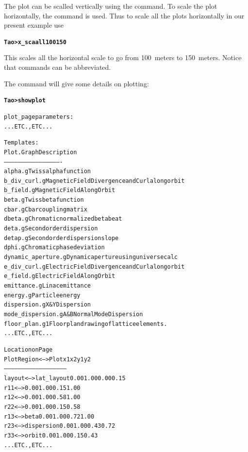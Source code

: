 \documentclass{hitec}
\newcommand{\BF}[1]{{\normalfont\textbf{#1}}}
\begin{document}
The plot can be scalled vertically using the  command. To scale the plot horizontally, 
the command  is used. Thus to scale all the plots horizontally in our present example use
\begin{alltt}
  \BF{Tao> x_sca all 100 150}
\end{alltt}
This scales all the horizontal scale to go from 100~meters to 150~meters.  Notice that
commands can be abbreviated.

The  command will give some details on plotting:
\begin{alltt}
  \BF{Tao> show plot}

    plot_page parameters:
    ... ETC., ETC ...

  Templates:
     Plot                  .Graph   Description
     --------------------  -------- -------------------
     alpha                 .g       Twiss alpha function
     b_div_curl            .g       Magnetic Field Divergence and Curl along orbit
     b_field               .g       Magnetic Field Along Orbit
     beta                  .g       Twiss beta function
     cbar                  .g       Cbar coupling matrix
     dbeta                 .g       Chromatic normalized beta beat
     deta                  .g       Second order dispersion
     detap                 .g       Second order dispersion slope
     dphi                  .g       Chromatic phase deviation
     dynamic_aperture      .g       Dynamic aperture using universe calc
     e_div_curl            .g       Electric Field Divergence and Curl along orbit
     e_field               .g       Electric Field Along Orbit
     emittance             .g       Linac emittance
     energy                .g       Particle energy
     dispersion            .g       X & Y Dispersion
     mode_dispersion       .g       A & B Normal Mode Dispersion
     floor_plan            .g1      Floor plan drawing of lattice elements.
    ... ETC., ETC ...

                                                 Location on Page
  Plot Region         <-->  Plot                 x1    x2    y1    y2
  -----------               -----------------------------------------
  layout              <-->  lat_layout          0.00  1.00  0.00  0.15
  r11                 <-->                      0.00  1.00  0.15  1.00
  r12                 <-->                      0.00  1.00  0.58  1.00
  r22                 <-->                      0.00  1.00  0.15  0.58
  r13                 <-->  beta                0.00  1.00  0.72  1.00
  r23                 <-->  dispersion          0.00  1.00  0.43  0.72
  r33                 <-->  orbit               0.00  1.00  0.15  0.43
    ... ETC., ETC ...
\end{alltt}
\end{document}
